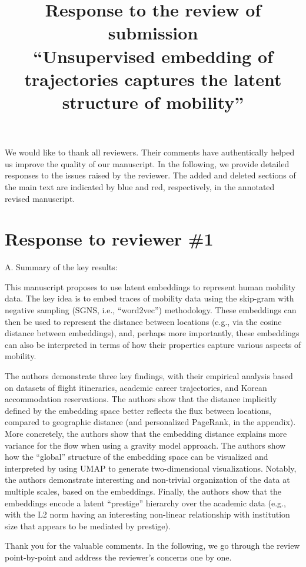 \documentclass[12pt,a4paper]{article}
\title{Response to the review of submission\\  ``Unsupervised embedding of trajectories captures the latent structure of mobility''}
\date{}
\makeatletter
\newcommand{\response}[1]{{\leavevmode\noindent #1}}
\newcommand{\rcomment}[1]{%
\vspace{10pt}
\begin{tcolorbox}[colback=black!3,colframe=white!45!black]
#1
\end{tcolorbox}
}
\renewcommand{\maketitle}{\bgroup\setlength{\parindent}{0pt}
\begin{flushleft}
\Large  \textbf{\@title}
\end{flushleft}\egroup
}
\makeatother
\begin{document}
\maketitle

We would like to thank all reviewers. 
Their comments have authentically helped us improve the quality of our manuscript.
In the following, we provide detailed responses to the issues raised by the reviewer.
The added and deleted sections of the main text are indicated by blue and red, respectively, in the annotated revised manuscript. 

\section*{Response to reviewer \#1}

\rcomment{%
A. Summary of the key results:

This manuscript proposes to use latent embeddings to represent human mobility data. The key idea is to embed traces of mobility data using the skip-gram with negative sampling (SGNS, i.e., “word2vec”) methodology. These embeddings can then be used to represent the distance between locations (e.g., via the cosine distance between embeddings), and, perhaps more importantly, these embeddings can also be interpreted in terms of how their properties capture various aspects of mobility.

The authors demonstrate three key findings, with their empirical analysis based on datasets of flight itineraries, academic career trajectories, and Korean accommodation reservations.
The authors show that the distance implicitly defined by the embedding space better reflects the flux between locations, compared to geographic distance (and personalized PageRank, in the appendix). More concretely, the authors show that the embedding distance explains more variance for the flow when using a gravity model approach.
The authors show how the “global” structure of the embedding space can be visualized and interpreted by using UMAP to generate two-dimensional visualizations. Notably, the authors demonstrate interesting and non-trivial organization of the data at multiple scales, based on the embeddings.
Finally, the authors show that the embeddings encode a latent “prestige” hierarchy over the academic data (e.g., with the L2 norm having an interesting non-linear relationship with institution size that appears to be mediated by prestige).
}

\response{%
Thank you for the valuable comments. 
In the following, we go through the review point-by-point and address the reviewer's concerns one by one.
}
\end{document}
